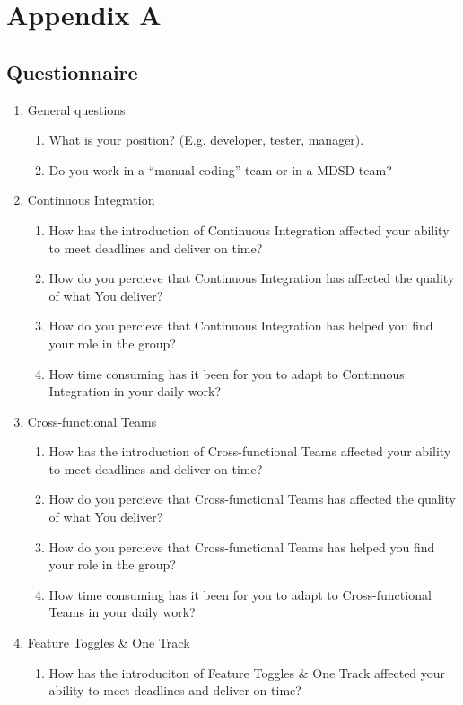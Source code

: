 \documentclass[final_report_innit.tex]{subfiles}
\begin{document}
\appendix
\section{Appendix A}

\subsection{Questionnaire}

\begin{enumerate}
	\item General questions
	\begin{enumerate}
		\item What is your position? (E.g. developer, tester, manager).
		\item Do you work in a ``manual coding'' team or in a MDSD team?
	\end{enumerate}
	\item Continuous Integration
	\begin{enumerate}
		\item How has the introduction of Continuous Integration affected your ability to meet deadlines and deliver on time?
		\item How do you percieve that Continuous Integration has affected the quality of what You deliver?
		\item How do you percieve that Continuous Integration has helped you find your role in the group?
		\item How time consuming has it been for you to adapt to Continuous Integration in your daily work?
	\end{enumerate}
	\item Cross-functional Teams
	\begin{enumerate}
		\item How has the introduction of Cross-functional Teams affected your ability to meet deadlines and deliver on time?
		\item How do you percieve that Cross-functional Teams has affected the quality of what You deliver?
		\item How do you percieve that Cross-functional Teams has helped you find your role in the group?
		\item How time consuming has it been for you to adapt to Cross-functional Teams in your daily work?
	\end{enumerate}
	\item Feature Toggles \& One Track
	\begin{enumerate}
		\item How has the introduciton of Feature Toggles \& One Track affected your ability to meet deadlines and deliver on time?

\end{enumerate}
\end{enumerate}
\end{document}
